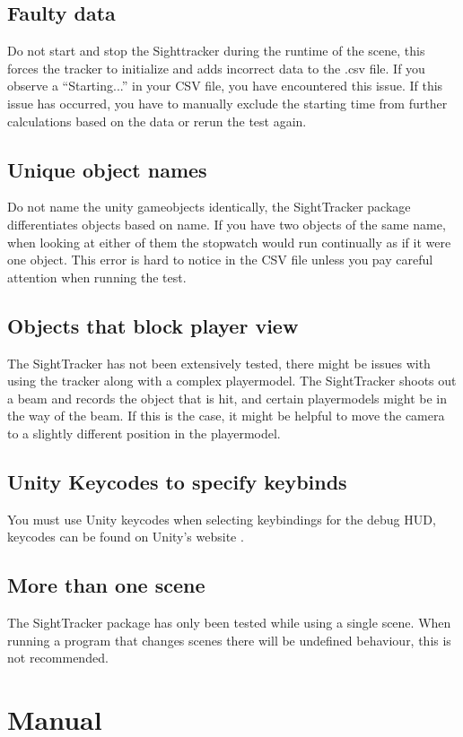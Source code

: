 \documentclass[letterpaper]{article}
\begin{document}
\subsection{Faulty data}
Do not start and stop the Sighttracker during the runtime of the scene, this forces the tracker to initialize and adds incorrect data to the .csv file. If you observe a “Starting...” in your CSV file, you have encountered this issue. If this issue has occurred, you have to manually exclude the starting time from further calculations based on the data or rerun the test again.
\subsection{Unique object names}
Do not name the unity gameobjects identically, the SightTracker package differentiates objects based on name. If you have two objects of the same name, when looking at either of them the stopwatch would run continually as if it were one object. This error is hard to notice in the CSV file unless you pay careful attention when running the test.
\subsection{Objects that block player view}
The SightTracker has not been extensively tested, there might be issues with using the tracker along with a complex playermodel. The SightTracker shoots out a beam and records the object that is hit, and certain playermodels might be in the way of the beam. If this is the case, it might be helpful to move the camera to a slightly different position in the playermodel.
\subsection{Unity Keycodes to specify keybinds}
You must use Unity keycodes when selecting keybindings for the debug HUD, keycodes can be found on Unity's website \cite{unitykeycode}.
\subsection{More than one scene}
The SightTracker package has only been tested while using a single scene. When running a program that changes scenes there will be undefined behaviour, this is not recommended.
\newpage
\section{Manual}
\end{document}
